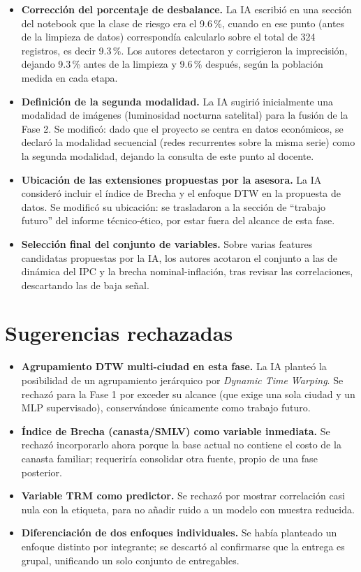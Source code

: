 \documentclass[11pt]{tg_usta}
\begin{document}
\begin{itemize}
\item \textbf{Corrección del porcentaje de desbalance.} La IA escribió en una sección del notebook que la clase de riesgo era el 9.6\,\%, cuando en ese punto (antes de la limpieza de datos) correspondía calcularlo sobre el total de 324 registros, es decir 9.3\,\%. Los autores detectaron y corrigieron la imprecisión, dejando 9.3\,\% antes de la limpieza y 9.6\,\% después, según la población medida en cada etapa.
\item \textbf{Definición de la segunda modalidad.} La IA sugirió inicialmente una modalidad de imágenes (luminosidad nocturna satelital) para la fusión de la Fase 2. Se modificó: dado que el proyecto se centra en datos económicos, se declaró la modalidad secuencial (redes recurrentes sobre la misma serie) como la segunda modalidad, dejando la consulta de este punto al docente.
\item \textbf{Ubicación de las extensiones propuestas por la asesora.} La IA consideró incluir el índice de Brecha y el enfoque DTW en la propuesta de datos. Se modificó su ubicación: se trasladaron a la sección de ``trabajo futuro'' del informe técnico-ético, por estar fuera del alcance de esta fase.
\item \textbf{Selección final del conjunto de variables.} Sobre varias features candidatas propuestas por la IA, los autores acotaron el conjunto a las de dinámica del IPC y la brecha nominal-inflación, tras revisar las correlaciones, descartando las de baja señal.
\end{itemize}

\section{Sugerencias rechazadas}

\begin{itemize}
\item \textbf{Agrupamiento DTW multi-ciudad en esta fase.} La IA planteó la posibilidad de un agrupamiento jerárquico por \emph{Dynamic Time Warping}. Se rechazó para la Fase 1 por exceder su alcance (que exige una sola ciudad y un MLP supervisado), conservándose únicamente como trabajo futuro.
\item \textbf{Índice de Brecha (canasta/SMLV) como variable inmediata.} Se rechazó incorporarlo ahora porque la base actual no contiene el costo de la canasta familiar; requeriría consolidar otra fuente, propio de una fase posterior.
\item \textbf{Variable TRM como predictor.} Se rechazó por mostrar correlación casi nula con la etiqueta, para no añadir ruido a un modelo con muestra reducida.
\item \textbf{Diferenciación de dos enfoques individuales.} Se había planteado un enfoque distinto por integrante; se descartó al confirmarse que la entrega es grupal, unificando un solo conjunto de entregables.
\end{itemize}
\end{document}
